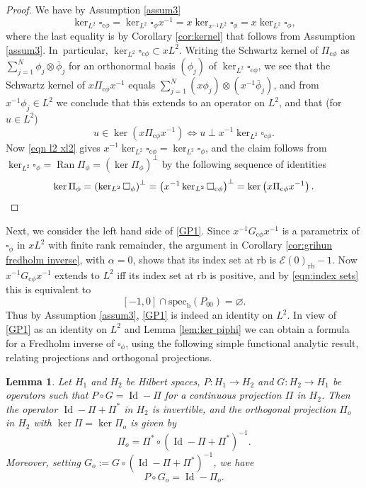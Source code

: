 \documentclass[11pt]{article}
\numberwithin{equation}{section}
\newcommand{\cphi}{{\mathrm{c}\phi}}
\theoremstyle{plain}
\newtheorem{Lemma}[Th]{Lemma}
\theoremstyle{definition}
\newcommand\calE{{\mathcal E}}
\newcommand{\rf}{{\mathrm{rb}}}
\newcommand{\bb}{{\mathrm{b}}}
\newcommand{\specb}{\mathrm{spec}_\bb}
\DeclareMathOperator{\Id}{Id}
\DeclareMathOperator\Ran{Ran}
\begin{document}
\begin{proof}
We have by Assumption \ref{assum3}
\begin{equation}
\label{eqn l2 xl2}
\ker_{L^2} \square_{\cphi} = \ker_{L^2} \square_\phi x^{-1} = x\ker_{x^{-1}L^2} \square_\phi = x\ker_{L^2}\square_\phi,
\end{equation}
where the last equality is by Corollary \ref{cor:kernel} that follows from Assumption \ref{assum3}.
In~particular, $\ker_{L^2} \square_{\cphi}\subset xL^2$. Writing the Schwartz kernel of $\Pi_{\cphi}$ as $\sum_{j=1}^N \phi_j\otimes\overline\phi_j$ for an orthonormal basis $(\phi_j)$ of $\ker_{L^2} \square_{\cphi}$, we see that the Schwartz kernel of $x\Pi_{\cphi}x^{-1}$ equals $\sum_{j=1}^N (x\phi_j)\otimes(x^{-1}\overline\phi_j)$, and from $x^{-1}\phi_j\in L^2$ we conclude that this extends to an operator on $L^2$, and that (for $u \in L^2$)
\[
u\in \ker \left(x \Pi_{\cphi} x^{-1} \right) \iff u \perp x^{-1}\ker_{L^2} \square_{\cphi}.
\]
Now \eqref{eqn l2 xl2} gives $ x^{-1}\ker_{L^2} \square_{\cphi}=\ker_{L^2}\square_\phi$, and the claim follows from $\ker_{L^2}\square_\phi = \Ran\Pi_\phi=(\ker\Pi_\phi)^\perp$ by the following sequence of identities
\[
\ker \Pi_\phi = \left(\ker_{L^2} \square_\phi \right)^\perp
= \left(x^{-1} \ker_{L^2} \square_{\cphi} \right)^\perp = \ker \left(x \Pi_{\cphi} x^{-1}\right).\qedhere
\]
\end{proof}
Next, we consider the left hand side of \eqref{GP1}.
Since $x^{-1}G_{\cphi}x^{-1}$ is a parametrix of $\square_\phi$ in $xL^2$ with finite rank remainder, the argument in Corollary \ref{cor:grihun fredholm inverse}, with $\alpha=0$, shows that its index set at $\rf$ is $\calE(0)_\rf - 1$. Now $x^{-1}G_{\cphi}x^{-1}$ extends to $L^2$ iff its index set at $\rf$ is positive, and by \eqref{eqn:index sets} this is equivalent to
\begin{equation}
\label{eqn:-1,0 condition}
[-1,0]\cap \specb(P_{00})=\varnothing.
\end{equation}
Thus by Assumption \ref{assum3}, \eqref{GP1} is indeed an identity on $L^2$.
In view of \eqref{GP1} as an identity on $L^2$ and Lemma \ref{lem:ker piphi} we can obtain a formula for a Fredholm inverse of
$\square_\phi$, using the following simple functional analytic result, relating projections and orthogonal projections.

\begin{Lemma}\label{funkana}
Let $H_1$ and $H_2$ be Hilbert spaces, $P:H_1\to H_2$ and $G:H_2 \to H_1$ be operators
such that $P\circ G=\Id - \Pi$ for a continuous projection $\Pi$ in $H_2$. Then the operator $\Id - \Pi + \Pi^*$ in $H_2$ is invertible, and the
orthogonal
projection $\Pi_o$ in $H_2$ with $\ker \Pi = \ker \Pi_o$ is given by
\begin{equation}\label{Po}
\Pi_o = \Pi^* \circ (\Id - \Pi + \Pi^*)^{-1}.
\end{equation}
Moreover, setting $G_o:= G \circ (\Id - \Pi + \Pi^*)^{-1}$, we have
\begin{equation}\label{Go}
P\circ G_o=\Id - \Pi_o.
\end{equation}
\end{Lemma}
\end{document}
